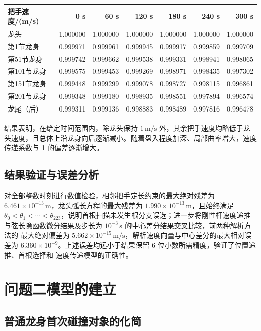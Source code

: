 \documentclass[
  11pt,
  UTF8]{ctexart}
\begin{document}
\begin{longtable}[]{@{}lrrrrrr@{}}
\toprule
把手速度/(m/s) & 0 s & 60 s & 120 s & 180 s & 240 s & 300 s \\
\midrule
\endhead
龙头 & 1.000000 & 1.000000 & 1.000000 & 1.000000 & 1.000000 &
1.000000 \\
第1节龙身 & 0.999971 & 0.999961 & 0.999945 & 0.999917 & 0.999859 &
0.999709 \\
第51节龙身 & 0.999742 & 0.999662 & 0.999538 & 0.999331 & 0.998941 &
0.998065 \\
第101节龙身 & 0.999575 & 0.999453 & 0.999269 & 0.998971 & 0.998435 &
0.997302 \\
第151节龙身 & 0.999448 & 0.999299 & 0.999078 & 0.998727 & 0.998115 &
0.996861 \\
第201节龙身 & 0.999348 & 0.999180 & 0.998935 & 0.998551 & 0.997894 &
0.996574 \\
龙尾（后） & 0.999311 & 0.999136 & 0.998883 & 0.998489 & 0.997816 &
0.996478 \\
\bottomrule
\end{longtable}

结果表明，在给定时间范围内，除龙头保持 \(1\,\mathrm{m/s}\)
外，其余把手速度均略低于龙头速度，且总体上沿龙身向后逐渐减小。随着盘入程度加深、局部曲率增大，速度传递系数与
1 的偏差逐渐增大。

\hypertarget{ux7ed3ux679cux9a8cux8bc1ux4e0eux8befux5deeux5206ux6790}{%
\subsection{结果验证与误差分析}\label{ux7ed3ux679cux9a8cux8bc1ux4e0eux8befux5deeux5206ux6790}}

对全部整数时刻进行数值检验，相邻把手定长约束的最大绝对残差为
\(6.461\times10^{-13}\,\mathrm m\)，龙头弧长方程的最大残差为
\(1.990\times10^{-13}\,\mathrm m\)，且始终满足
\(\theta_0<\theta_1<\cdots<\theta_{223}\)，说明首根扫描未发生根分支误选；进一步将刚性杆速度递推
与弦长隐函数微分结果及步长为 \(10^{-3}\,\mathrm s\) 的中心差分结果交叉比较，前两种解析方法的
最大绝对偏差为 \(5.662\times10^{-15}\,\mathrm{m/s}\)，解析速度向量与中心差分的最大相对误差为
\(6.360\times10^{-9}\)。上述误差均远小于结果保留 6 位小数所需精度，验证了位置递推、首根选择和
速度传递模型的正确性。

\section{问题二模型的建立}

\subsection{普通龙身首次碰撞对象的化简}
\end{document}
